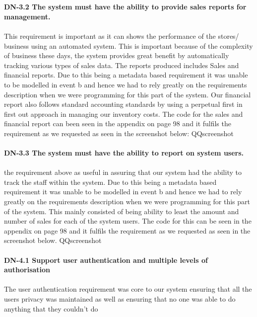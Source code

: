 \documentclass[a4paper]{article}
\begin{document}
\\\\
\textbf{DN-3.2 The system must have the ability to provide sales reports for management.}
\\\\
This requirement is important as it can shows the performance of the stores/ business using an automated system. This is important because of the complexity of business these days, the system provides great benefit by automatically tracking various types of sales data. The reports produced includes Sales and financial reports. Due to this being a metadata based requirement it was unable to be modelled in event b and hence we had to rely greatly on the requirements description when we were programming for this part of the system. Our financial report also follows standard accounting standards by using a perpetual first in first out approach in managing our inventory costs. The code for the sales and financial report can been seen in the appendix on page 98 and it fulfils the requirement as we requested as seen in the screenshot below: QQscreenshot
\\\\

\textbf{DN-3.3 The system must have the ability to report on system users.}
\\\\
the requirement above as useful in assuring that our system had the ability to track the staff within the system. Due to this being a metadata based requirement it was unable to be modelled in event b and hence we had to rely greatly on the requirements description when we were programming for this part of the system. This mainly consisted of being ability to least the amount and number of sales for each of the system users. The code for this can be seen in the appendix on page 98 and it fulfils the requirement as we requested as seen in the screenshot below. QQscreenshot
\\\\
\textbf{DN-4.1 Support user authentication and multiple levels of authorisation}
\\\\
The user authentication requirement was core to our system ensuring that all the users privacy was maintained as well as ensuring that no one was able to do anything that they couldn't do
\\\\
\end{document}
